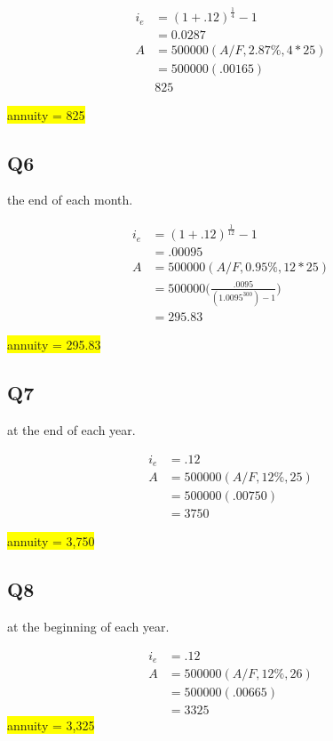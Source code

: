 \documentclass[12pt]{article}
\newcommand{\hilight}[1]{\colorbox{yellow}{#1}}
\begin{document}
\begin{align*}
i_e &= (1 + .12)^{\frac{1}{4}} - 1\\
&= 0.0287\\
A &= 500000(A/F, 2.87\%, 4*25)\\
&= 500000(.00165)\\
& 825
\end{align*}

\hilight{annuity = 825}

\subsection*{Q6}
the end of each month.

\begin{align*}
i_e &= (1 + .12)^{\frac{1}{12}} - 1\\
&= .00095\\
A &= 500000(A/F, 0.95\%, 12*25)\\
&=500000\bigg ( \frac{.0095}{(1.0095^{300})-1} \bigg)\\
&=295.83
\end{align*}

\hilight{annuity = 295.83}

\subsection*{Q7}
at the end of each year.

\begin{align*}
i_e &= .12\\
A &= 500000(A/F, 12\%, 25)\\
&= 500000(.00750)\\
&= 3750
\end{align*}

\hilight{annuity = 3,750}

\subsection*{Q8}
at the beginning of each year.

\begin{align*}
i_e &= .12\\
A &= 500000(A/F, 12\%, 26)\\
&= 500000(.00665)\\
&= 3325
\end{align*}
\hilight{annuity = 3,325}
\end{document}
